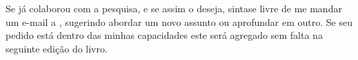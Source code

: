 \begin{patrocinio}
\begin{center}
{\begin{minipage}[c][]{13.5cm}
    \hspace{0.5cm}
    Se já colaborou com a pesquisa, e se assim o deseja, 
    sintase livre de me mandar um e-mail a \ImprimirEmail, 
    sugerindo abordar um novo assunto ou aprofundar em outro.
    Se seu pedido está dentro das minhas capacidades 
    este será agregado sem falta na seguinte edição do livro.\\

    \begin{flushright}
    \myauthor ~\\ 
    \end{flushright}
	\end{minipage}
}
\end{center}
\end{patrocinio}%

